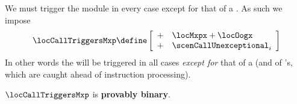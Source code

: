 We must trigger the \mxpMod{} module in every case except for that of a \staticxSH{}.
As such we impose
\[
	\locCallTriggersMxp
	\define
	\left[ \begin{array}{ll}
		+ & \locMxpx + \locOogx         \\
		+ & \scenCallUnexceptional _{i} \\
	\end{array} \right]
\]
In other words the \mxpMod{} will be triggered in all cases \emph{except for} that of a \staticxSH{}
(and of \suxSH{}'s, which are caught ahead of instruction processing).

\saNote{}
$\locCallTriggersMxp$ is \textbf{provably binary}.
